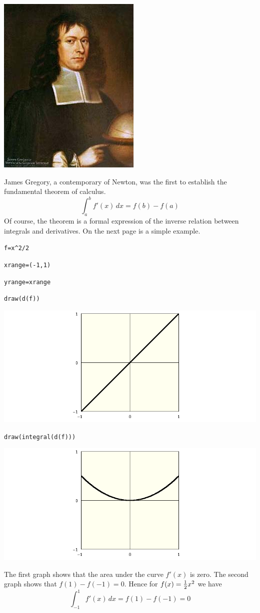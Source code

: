 \newpage

\begin{center}
\includegraphics[scale=0.5]{JamesGregory.jpeg}
\end{center}

\bigskip

\noindent
James Gregory, a contemporary of Newton, was the first to establish the fundamental theorem of calculus.
$$\int_a^b f'(x)\,dx=f(b)-f(a)$$
Of course, the theorem is a formal expression of the inverse relation between integrals and derivatives.
On the next page is a simple example.

\newpage

\verb$f=x^2/2$

\verb$xrange=(-1,1)$

\verb$yrange=xrange$

\verb$draw(d(f))$

\noindent
\includegraphics[scale=0.5]{funda1.png}

\verb$draw(integral(d(f)))$

\medskip
\noindent
\includegraphics[scale=0.5]{funda2.png}

\medskip
\noindent
The first graph shows that the area under the curve $f'(x)$ is zero.
The second graph shows that $f(1)-f(-1)=0$.
Hence for $f(x)={1\over2}x^2$ we have
$$\int_{-1}^1f'(x)\,dx=f(1)-f(-1)=0$$


